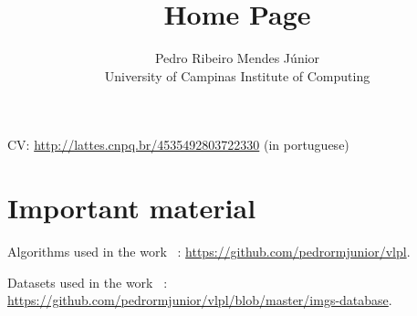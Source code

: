 \documentclass{article}
\title{Home Page}
\author{Pedro Ribeiro Mendes J{\'u}nior\\University of Campinas \textemdash{} Institute of Computing}
\newcommand{\mycite}[1]{\citeauthor{#1}~\cite{#1}}
\begin{document}
\nocite{Penatti2015}
\nocite{Pazinato2015}
\nocite{MendesJr2011}

\maketitle

CV: \url{http://lattes.cnpq.br/4535492803722330} (in portuguese)


\section{Important material}
\label{sec:important-material}

Algorithms used in the work \mycite{MendesJr2011}: \url{https://github.com/pedrormjunior/vlpl}.

Datasets used in the work \mycite{MendesJr2011}: \url{https://github.com/pedrormjunior/vlpl/blob/master/imgs-database}.



\end{document}
